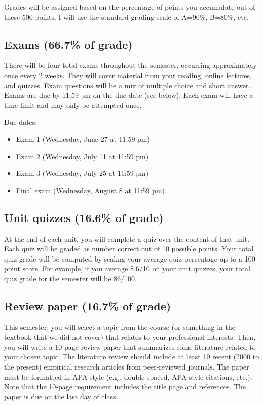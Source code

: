 \documentclass[10pt]{article}
\begin{document}
Grades will be assigned based on the percentage of points you accumulate out of these 500 points.  I will use the standard grading scale of A=90\%, B=80\%, etc.

\subsection*{Exams (66.7\% of grade)}
\label{sec-6-1}
There will be four total exams throughout the semester, occurring 
approximately once every 2  weeks.  They will cover material 
from your reading, online lectures, and quizzes.  Exam questions will be a mix of multiple choice and short answer.  Exams are due by 11:59 pm on 
the due date (see below).  Each exam will have a time limit and may only 
be attempted once.

Due dates:

\begin{itemize}
\item Exam 1 (Wednesday, June 27 at 11:59 pm)
\item Exam 2 (Wednesday, July 11 at 11:59 pm)
\item Exam 3 (Wednesday, July 25 at 11:59 pm)
\item Final exam (Wednesday, August 8 at 11:59 pm)
\end{itemize}

\subsection*{Unit quizzes (16.6\% of grade)}
\label{sec-6-2}
At the end of each unit, you will complete a quiz over the content of that 
unit. Each quiz will be graded as number correct out of 10 possible points.  Your total quiz grade will be computed by scaling your average quiz percentage up to a 100 point score.  For example, if you average 8.6/10 on your unit quizzes, your total quiz grade for the semester will be 86/100. 

\subsection*{Review paper (16.7\% of grade)}
\label{sec-6-3}
This semester, you will select a topic from the course (or something in the textbook that we did not cover) that relates to your professional interests.  Then, you will write a 10 page review paper that summarizes some literature related to your chosen topic. The literature review should include at least 10 recent (2000 to the present) empirical research articles from peer-reviewed journals. The paper must be formatted in APA style (e.g., double-spaced, APA-style citations, etc.).  Note that the 10-page requirement includes the title page and references.  The paper is due on the last day of class.   
\end{document}
